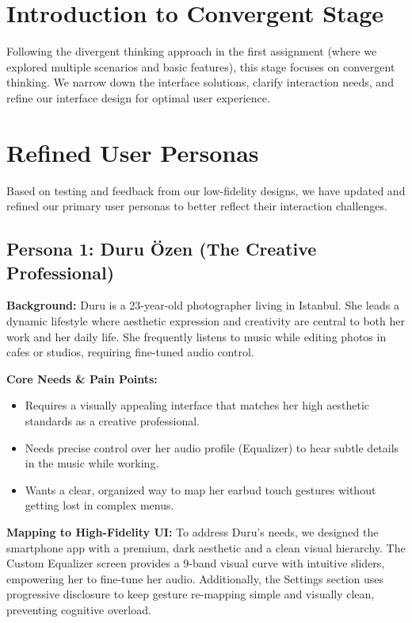 \documentclass[12pt, a4paper]{report}
\begin{document}
\section{Introduction to Convergent Stage}
Following the divergent thinking approach in the first assignment (where we explored multiple scenarios and basic features), this stage focuses on convergent thinking. We narrow down the interface solutions, clarify interaction needs, and refine our interface design for optimal user experience.

\section{Refined User Personas}
Based on testing and feedback from our low-fidelity designs, we have updated and refined our primary user personas to better reflect their interaction challenges.

\subsection{Persona 1: Duru Özen (The Creative Professional)}

\textbf{Background:} Duru is a 23-year-old photographer living in Istanbul. She leads a dynamic lifestyle where aesthetic expression and creativity are central to both her work and her daily life. She frequently listens to music while editing photos in cafes or studios, requiring fine-tuned audio control.

\textbf{Core Needs \& Pain Points:}
\begin{itemize}
  \item Requires a visually appealing interface that matches her high aesthetic standards as a creative professional.
  \item Needs precise control over her audio profile (Equalizer) to hear subtle details in the music while working.
  \item Wants a clear, organized way to map her earbud touch gestures without getting lost in complex menus.
\end{itemize}

\textbf{Mapping to High-Fidelity UI:}
To address Duru's needs, we designed the smartphone app with a premium, dark aesthetic and a clean visual hierarchy. The Custom Equalizer screen provides a 9-band visual curve with intuitive sliders, empowering her to fine-tune her audio. Additionally, the Settings section uses progressive disclosure to keep gesture re-mapping simple and visually clean, preventing cognitive overload.
\end{document}
